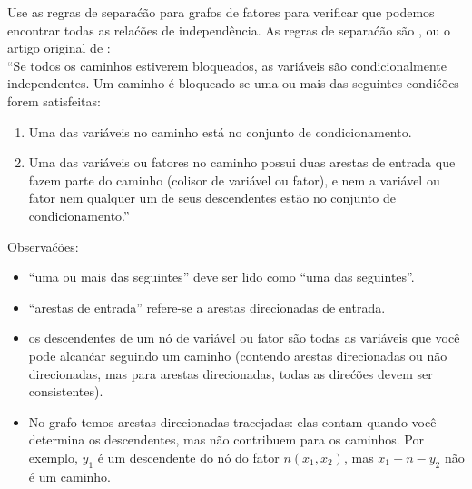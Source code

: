 \begin{exenumerate}
\begin{center}
{}
\end{center}

Use as regras de separa\'c\~ao para grafos de fatores para verificar que podemos encontrar todas as rela\'c\~oes de independ\^encia. As regras de separa\'c\~ao s\~ao \citep[veja][Se\'c\~ao 4.4.1]{Barber2012}, ou o artigo original de \citet{Frey2003}:\\[1ex]
``Se todos os caminhos estiverem bloqueados, as vari\'aveis s\~ao condicionalmente independentes. Um caminho \'e bloqueado se uma ou mais das seguintes condi\'c\~oes forem satisfeitas:
\begin{enumerate}
    \item Uma das vari\'aveis no caminho est\'a no conjunto de condicionamento.
    \item Uma das vari\'aveis ou fatores no caminho possui duas arestas de entrada que fazem parte do caminho (colisor de vari\'avel ou fator), e nem a vari\'avel ou fator nem qualquer um de seus descendentes est\~ao no conjunto de condicionamento.''
\end{enumerate}

Observa\'c\~oes:
\begin{itemize}
    \item ``uma ou mais das seguintes'' deve ser lido como ``uma das seguintes''. 
    \item ``arestas de entrada'' refere-se a arestas direcionadas de entrada.
    \item os descendentes de um n\'o de vari\'avel ou fator s\~ao todas as vari\'aveis que voc\^e pode alcan\'car seguindo um caminho (contendo arestas direcionadas ou n\~ao direcionadas, mas para arestas direcionadas, todas as dire\'c\~oes devem ser consistentes).
    \item No grafo temos arestas direcionadas tracejadas: elas contam quando voc\^e determina os descendentes, mas n\~ao contribuem para os caminhos. Por exemplo, $y_1$ \'e um descendente do n\'o do fator $n(x_1,x_2)$, mas $x_1 - n - y_2$ n\~ao \'e um caminho.
\end{itemize}


\end{exenumerate}
